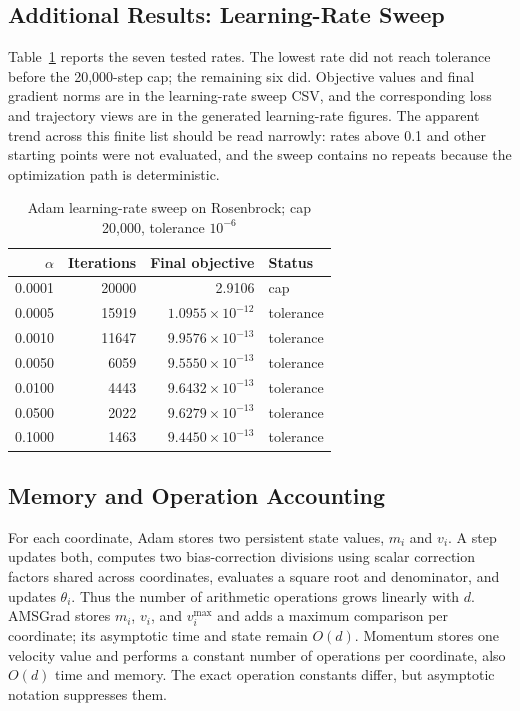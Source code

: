 ﻿\documentclass[conference]{IEEEtran}
\begin{document}
\subsection{Additional Results: Learning-Rate Sweep}
Table~\ref{tab:lr} reports the seven tested rates. The lowest rate did not reach tolerance before the 20,000-step cap; the remaining six did. Objective values and final gradient norms are in the learning-rate sweep CSV, and the corresponding loss and trajectory views are in the generated learning-rate figures. The apparent trend across this finite list should be read narrowly: rates above 0.1 and other starting points were not evaluated, and the sweep contains no repeats because the optimization path is deterministic.
\begin{table}[t]
\caption{Adam learning-rate sweep on Rosenbrock; cap 20,000, tolerance $10^{-6}$}
\label{tab:lr}
\centering
\begin{tabular}{rrrl}
\toprule
$\alpha$ & Iterations & Final objective & Status\\
\midrule
0.0001 & 20000 & 2.9106 & cap\\
0.0005 & 15919 & $1.0955\times10^{-12}$ & tolerance\\
0.0010 & 11647 & $9.9576\times10^{-13}$ & tolerance\\
0.0050 & 6059 & $9.5550\times10^{-13}$ & tolerance\\
0.0100 & 4443 & $9.6432\times10^{-13}$ & tolerance\\
0.0500 & 2022 & $9.6279\times10^{-13}$ & tolerance\\
0.1000 & 1463 & $9.4450\times10^{-13}$ & tolerance\\
\bottomrule
\end{tabular}
\end{table}
\subsection{Memory and Operation Accounting}
For each coordinate, Adam stores two persistent state values, $m_i$ and $v_i$. A step updates both, computes two bias-correction divisions using scalar correction factors shared across coordinates, evaluates a square root and denominator, and updates $\theta_i$. Thus the number of arithmetic operations grows linearly with $d$. AMSGrad stores $m_i$, $v_i$, and $v_i^{\max}$ and adds a maximum comparison per coordinate; its asymptotic time and state remain $O(d)$. Momentum stores one velocity value and performs a constant number of operations per coordinate, also $O(d)$ time and memory. The exact operation constants differ, but asymptotic notation suppresses them.
\end{document}
